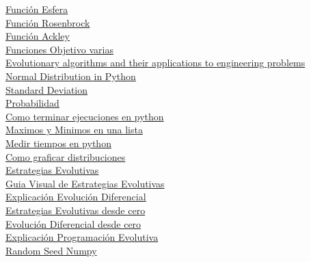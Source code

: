 \documentclass{article}
\begin{document}
\href{https://www.sfu.ca/~ssurjano/spheref.html}{Función Esfera}\\
\href{https://www.sfu.ca/~ssurjano/rosen.html}{Función Rosenbrock}\\
\href{https://www.sfu.ca/~ssurjano/ackley.html}{Función Ackley}\\
\href{https://deap.readthedocs.io/en/master/api/benchmarks.html#deap.benchmarks.sphere}{Funciones Objetivo varias}\\
\href{https://link.springer.com/article/10.1007/s00521-020-04832-8}{Evolutionary algorithms and their applications to engineering problems}\\
\href{https://www.askpython.com/python/normal-distribution}{Normal Distribution in Python}\\
\href{https://www.nlm.nih.gov/nichsr/stats_tutorial/section2/mod8_sd.html}{Standard Deviation}\\
\href{https://es.khanacademy.org/math/probability/data-distributions-a1/summarizing-spread-distributions/a/calculating-standard-deviation-step-by-step}{Probabilidad}\\
\href{https://learnpython.com/blog/end-python-script/}{Como terminar ejecuciones en python}\\
\href{https://www.tutorialspoint.com/python-program-to-find-maximum-and-minimum-element-s-position-in-a-list}{Maximos y Minimos en una lista}\\
\href{https://stackoverflow.com/questions/1557571/how-do-i-get-time-of-a-python-programs-execution}{Medir tiempos en python}\\
\href{https://stackoverflow.com/questions/10138085/how-to-plot-normal-distribution}{Como graficar distribuciones}\\
\href{https://openai.com/blog/evolution-strategies/}{Estrategias Evolutivas}\\
\href{https://blog.otoro.net/2017/10/29/visual-evolution-strategies/}{Guia Visual de Estrategias Evolutivas}\\
\href{https://www.youtube.com/watch?v=DKU0LEFKiU0&t=709s}{Explicación Evolución Diferencial}\\
\href{https://machinelearningmastery.com/evolution-strategies-from-scratch-in-python/}{Estrategias Evolutivas desde cero}\\
\href{https://machinelearningmastery.com/differential-evolution-from-scratch-in-python/}{Evolución Diferencial desde cero}\\
\href{https://towardsdatascience.com/unit-5-evolutionary-programming-cced3a00166a}{Explicación Programación Evolutiva}\\
\href{https://www.sharpsightlabs.com/blog/numpy-random-seed/}{Random Seed Numpy}
\end{document}
